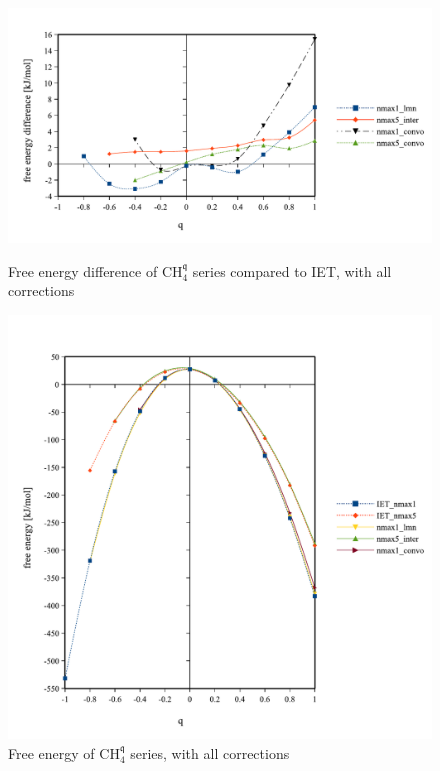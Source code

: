\begin{figure}[!th]
\begin{centering}
\includegraphics[bb=0bp 20bp 510bp 263bp,width=0.9\columnwidth]{_figure/results/ch4_diff_inter}
\par\end{centering}
\caption{Free energy difference of $\mathrm{C}\mathrm{H}_{4}^{\mathfrak{q}}$
series compared to IET, with all corrections\label{fig:Comparison-to-IET,with-corr}}

\begin{centering}
\vspace{0.33cm}
\par\end{centering}
\begin{centering}
\includegraphics[bb=0bp 20bp 510bp 490bp,width=0.9\columnwidth]{_figure/results/ch4_inter_alles}
\par\end{centering}
\caption{Free energy of $\mathrm{C}\mathrm{H}_{4}^{\mathfrak{q}}$ series,
with all corrections\label{fig:Comparison-to-IET,with-corr-alles}}
\end{figure}

